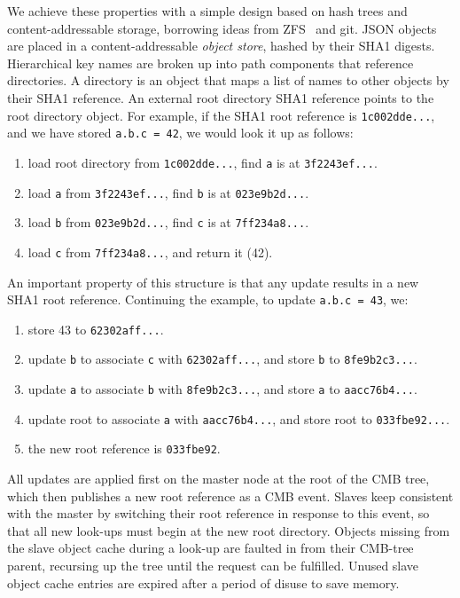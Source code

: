 We achieve these properties with a simple design based on hash trees
and content-addressable storage, borrowing ideas from
ZFS~\cite{Bonwick03thezettabyte} and git. %
JSON objects are placed in a content-addressable
{\em object store}, hashed by their SHA1 digests.
Hierarchical key names are broken up into path components that reference
directories.
A directory is an object that maps a list of names to other objects by
their SHA1 reference.
An external root directory SHA1 reference points to the root directory object.
For example, if the SHA1 root reference is {\tt 1c002dde...}, and we have
stored {\tt a.b.c = 42}, we would look it up as follows:
\begin{enumerate}
\item{load root directory from {\tt 1c002dde...}, find {\tt a} is at
{\tt 3f2243ef...}.}
\item{load {\tt a} from {\tt 3f2243ef...}, find {\tt b} is at
{\tt 023e9b2d...}.}
\item{load {\tt b} from {\tt 023e9b2d...}, find {\tt c} is at
{\tt 7ff234a8...}.}
\item{load {\tt c} from {\tt 7ff234a8...}, and return it (42).}
\end{enumerate}

An important property of this structure is that any update results
in a new SHA1 root reference.  Continuing the example, to update {\tt a.b.c = 43}, we:
\begin{enumerate}
\item{store 43 to {\tt 62302aff...}.}
\item{update {\tt b} to associate {\tt c} with {\tt 62302aff...}, and store {\tt b} to {\tt 8fe9b2c3...}.}
\item{update {\tt a} to associate {\tt b} with {\tt 8fe9b2c3...}, and store {\tt a} to {\tt aacc76b4...}.}
\item{update root to associate {\tt a} with {\tt aacc76b4...}, and store root to {\tt 033fbe92...}.}
\item{the new root reference is {\tt 033fbe92}.}
\end{enumerate}


All updates are applied first on the master node at the root of the
CMB tree, which then publishes a new root reference as a CMB event.
Slaves keep consistent with the master by switching their root reference
in response to this event, so that all new look-ups must begin at the
new root directory.  Objects missing from the slave object cache during
a look-up are faulted in from their CMB-tree parent, recursing up the tree
until the request can be fulfilled.  Unused slave object cache entries are
expired after a period of disuse to save memory.


